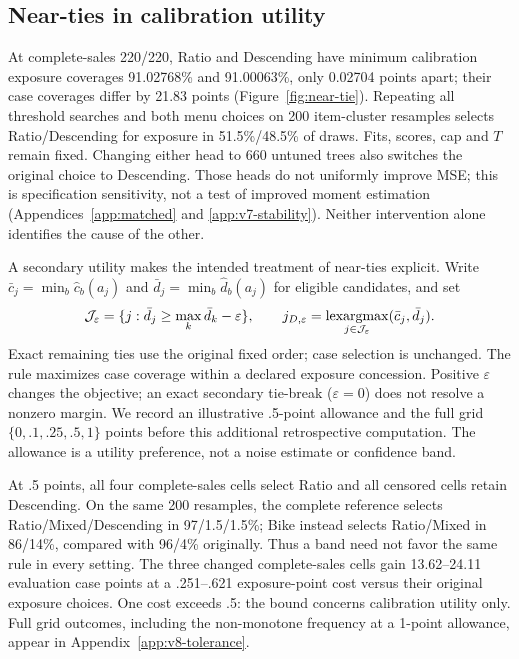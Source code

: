 \subsection{Near-ties in calibration utility}
\label{sec:head-intervention}\label{sec:selection-stability}\label{sec:tolerance}
At complete-sales 220/220, Ratio and Descending have minimum calibration exposure coverages 91.02768\% and 91.00063\%, only 0.02704 points apart; their case coverages differ by 21.83 points (Figure~\ref{fig:near-tie}). Repeating all threshold searches and both menu choices on 200 item-cluster resamples selects Ratio/Descending for exposure in 51.5\%/48.5\% of draws. Fits, scores, cap and $T$ remain fixed. Changing either head to 660 untuned trees also switches the original choice to Descending. Those heads do not uniformly improve MSE; this is specification sensitivity, not a test of improved moment estimation (Appendices~\ref{app:matched} and \ref{app:v7-stability}). Neither intervention alone identifies the cause of the other.

A secondary utility makes the intended treatment of near-ties explicit. Write $\bar c_j=\min_b\widehat c_b(a_j)$ and $\bar d_j=\min_b\widehat d_b(a_j)$ for eligible candidates, and set
\begin{equation}
 \mathcal J_\varepsilon=\{j:\bar d_j\geq\max_k\bar d_k-\varepsilon\},
 \qquad j_{D,\varepsilon}=\mathop{\rm lexargmax}_{j\in\mathcal J_\varepsilon}
 (\bar c_j,\bar d_j).
 \label{eq:tolerance}
\end{equation}
Exact remaining ties use the original fixed order; case selection is unchanged. The rule maximizes case coverage within a declared exposure concession. Positive $\varepsilon$ changes the objective; an exact secondary tie-break ($\varepsilon=0$) does not resolve a nonzero margin. We record an illustrative .5-point allowance and the full grid $\{0,.1,.25,.5,1\}$ points before this additional retrospective computation. The allowance is a utility preference, not a noise estimate or confidence band.

At .5 points, all four complete-sales cells select Ratio and all censored cells retain Descending. On the same 200 resamples, the complete reference selects Ratio/Mixed/Descending in 97/1.5/1.5\%; Bike instead selects Ratio/Mixed in 86/14\%, compared with 96/4\% originally. Thus a band need not favor the same rule in every setting. The three changed complete-sales cells gain 13.62--24.11 evaluation case points at a .251--.621 exposure-point cost versus their original exposure choices. One cost exceeds .5: the bound concerns calibration utility only. Full grid outcomes, including the non-monotone frequency at a 1-point allowance, appear in Appendix~\ref{app:v8-tolerance}.

